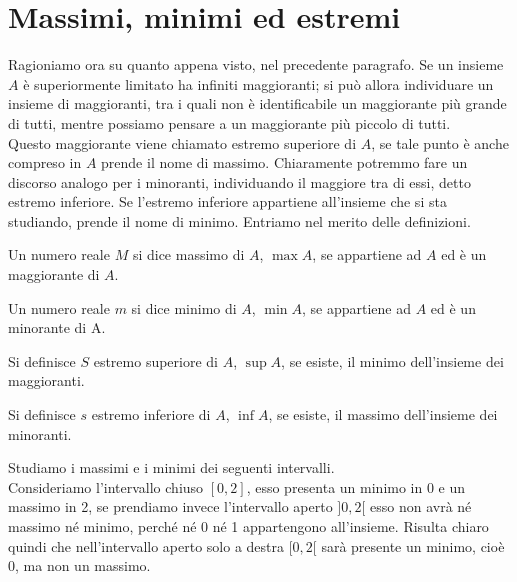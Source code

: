 \section{Massimi, minimi ed estremi}
Ragioniamo ora su quanto appena visto, nel precedente paragrafo. Se un 
insieme $A$ è superiormente limitato ha infiniti maggioranti; si può allora 
individuare un insieme di maggioranti, tra i quali non è identificabile un 
maggiorante più grande di tutti, mentre possiamo pensare a un maggiorante più 
piccolo di tutti.\\

Questo maggiorante viene chiamato estremo superiore di $A$, se tale punto è 
anche compreso in $A$ prende il nome di massimo. Chiaramente potremmo fare un 
discorso analogo per i minoranti, individuando il maggiore tra di essi, detto 
estremo inferiore. Se l'estremo inferiore appartiene all'insieme che si sta 
studiando, prende il nome di minimo. Entriamo nel merito delle definizioni.\\

\begin{definizione}
  Un numero reale $M$ si dice massimo di $A$, $\max{A}$, se appartiene 
ad $A$ ed è un maggiorante di $A$.\\
\end{definizione}

\begin{definizione}
  Un numero reale $m$ si dice minimo di $A$, $\min{A}$, se appartiene 
ad $A$ ed è un minorante di A.\\
\end{definizione}

\begin{definizione}
  Si definisce $S$ estremo superiore di $A$, $\sup{A}$, se esiste, il 
minimo dell'insieme dei maggioranti.\\
\end{definizione}

\begin{definizione}
  Si definisce $s$ estremo inferiore di $A$, $\inf{A}$, se esiste, il 
massimo dell'insieme dei minoranti.\\
\end{definizione}

\begin{esempio}Studiamo i massimi e i minimi dei seguenti intervalli.\\
Consideriamo l'intervallo chiuso $[0,2]$, esso presenta un minimo in 0 e un 
massimo in 2, se prendiamo invece l'intervallo aperto $]0,2[$ esso non avrà 
né massimo né minimo, perché né 0 né 1 appartengono all'insieme. Risulta 
chiaro quindi che nell'intervallo aperto solo a destra $[0,2[$ sarà presente 
un minimo, cioè 0, ma non un massimo.\\
\end{esempio}

